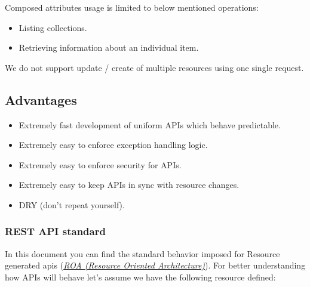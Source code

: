 \documentclass[letterpaper,10pt,english]{sphinxmanual}
\begin{document}
Composed attributes usage is limited to below mentioned operations:
\begin{itemize}
\item {} 
Listing collections.

\item {} 
Retrieving information about an individual item.

\end{itemize}

We do not support update / create of multiple resources using one single request.


\subsection{Advantages}
\label{features/roa:advantages}\begin{itemize}
\item {} 
Extremely fast development of uniform APIs which behave predictable.

\item {} 
Extremely easy to enforce exception handling logic.

\item {} 
Extremely easy to enforce security for APIs.

\item {} 
Extremely easy to keep APIs in sync with resource changes.

\item {} 
DRY (don't repeat yourself).

\end{itemize}


\subsubsection{REST API standard}
\label{features/roa/rest_standard:rest-api-standard}\label{features/roa/rest_standard::doc}
In this document you can find the standard behavior imposed for Resource generated apis ({\hyperref[features/roa::doc]{\emph{ROA (Resource Oriented Architecture)}}}). For better
understanding how APIs will behave let's assume we have the following resource defined:
\end{document}
